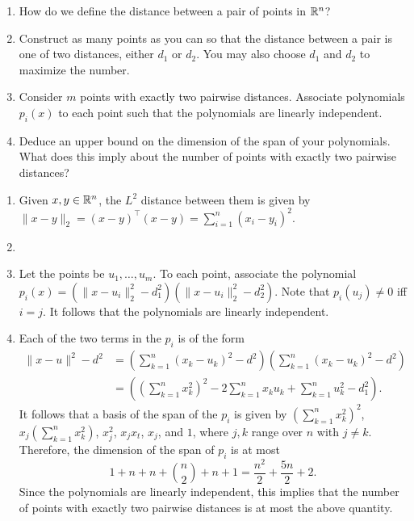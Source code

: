 \documentclass{article}
\begin{document}
	\begin{exercise}
		\phantom{pain}
		\begin{enumerate}[label=(\alph*)]
			\item How do we define the distance between a pair of points in $\mathbb{R}^n$?
			\item Construct as many points as you can so that the distance between a pair is one of two distances, either $d_1$ or $d_2$. You may also choose $d_1$ and $d_2$ to maximize the number.
			\item Consider $m$ points with exactly two pairwise distances. Associate polynomials $p_i(x)$ to each point such that the polynomials are linearly independent.
			\item Deduce an upper bound on the dimension of the span of your polynomials. What does this imply about the number of points with exactly two pairwise distances?
		\end{enumerate}
	\end{exercise}
	\begin{solution*}
		\begin{enumerate}[label=(\alph*)]
			\item Given $x,y \in \mathbb{R}^n$, the $L^2$ distance between them is given by $\|x-y\|_2 = (x-y)^\top(x-y) = \sum_{i=1}^n (x_i - y_i)^2$.
			\item 
			\item Let the points be $u_1,\ldots,u_m$. To each point, associate the polynomial $p_i(x) = (\|x-u_i\|_2^2 - d_1^2)(\|x-u_i\|_2^2 - d_2^2)$. Note that $p_i(u_j) \ne 0$ iff $i = j$. It follows that the polynomials are linearly independent.
			\item Each of the two terms in the $p_i$ is of the form
			\begin{align*}
				\|x-u\|^2 - d^2 &= \left(\sum_{k=1}^{n} (x_k - u_k)^2 - d^2\right) \left(\sum_{k=1}^{n} (x_k - u_k)^2 - d^2\right) \\
					&= \left(\left(\sum_{k=1}^{n} x_k^2\right)^2 - 2\sum_{k=1}^n x_k u_k + \sum_{k=1}^n u_k^2 - d_1^2\right).
			\end{align*}
			It follows that a basis of the span of the $p_i$ is given by $\left(\sum_{k=1}^n x_k^2\right)^2$, $x_j \left( \sum_{k=1}^n x_k^2 \right)$, $x_j^2$, $x_jx_t$, $x_j$, and $1$, where $j,k$ range over $n$ with $j \ne k$. Therefore, the dimension of the span of $p_i$ is at most
			\[ 1 + n + n + \binom{n}{2} + n + 1 = \frac{n^2}{2} + \frac{5n}{2} + 2. \]
			Since the polynomials are linearly independent, this implies that the number of points with exactly two pairwise distances is at most the above quantity. 
		\end{enumerate}
	\end{solution*}
\end{document}

